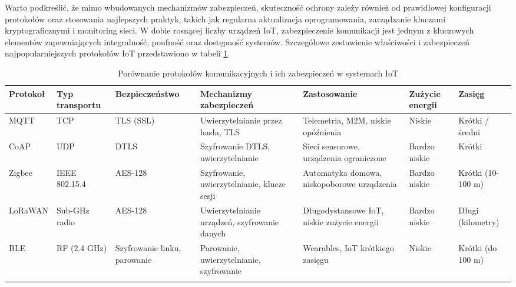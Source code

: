 Warto podkreślić, że mimo wbudowanych mechanizmów zabezpieczeń, skuteczność ochrony zależy również od prawidłowej konfiguracji protokołów oraz stosowania najlepszych praktyk, takich jak regularna aktualizacja oprogramowania, zarządzanie kluczami kryptograficznymi i monitoring sieci. W dobie rosnącej liczby urządzeń IoT, zabezpieczenie komunikacji jest jednym z kluczowych elementów zapewniających integralność, poufność oraz dostępność systemów.
Szczegółowe zestawienie właściwości i zabezpieczeń najpopularniejszych protokołów IoT przedstawiono w tabeli \ref{tab:iot_protocols_security}.
\begin{landscape}
\vspace*{2cm}
\renewcommand{\arraystretch}{1.3} 
\setlength{\tabcolsep}{4pt} 
\begin{table}[htbp]
\centering
\small 
\caption{Porównanie protokołów komunikacyjnych i ich zabezpieczeń w systemach IoT}
\label{tab:iot_protocols_security}
\begin{tabular}{|l|l|l|p{4cm}|p{3.5cm}|l|l|}
\hline
\textbf{Protokoł} & \textbf{Typ transportu} & \textbf{Bezpieczeństwo} & \textbf{Mechanizmy zabezpieczeń} & \textbf{Zastosowanie} & \textbf{Zużycie energii} & \textbf{Zasięg}\cite{sicari2015security} \\ \hline
MQTT & TCP & TLS (SSL) & Uwierzytelnianie przez hasła, TLS & Telemetria, M2M, niskie opóźnienia & Niskie & Krótki / średni \\ \hline
CoAP & UDP & DTLS & Szyfrowanie DTLS, uwierzytelnianie & Sieci sensorowe, urządzenia ograniczone & Bardzo niskie & Krótki \\ \hline
Zigbee & IEEE 802.15.4 & AES-128 & Szyfrowanie, uwierzytelnianie, klucze sesji & Automatyka domowa, niskopoborowe urządzenia & Bardzo niskie & Krótki (10-100 m) \\ \hline
LoRaWAN & Sub-GHz radio & AES-128 & Uwierzytelnianie urządzeń, szyfrowanie danych & Długodystansowe IoT, niskie zużycie energii & Bardzo niskie & Długi (kilometry) \\ \hline
BLE & RF (2.4 GHz) & Szyfrowanie linku, parowanie & Parowanie, uwierzytelnianie, szyfrowanie & Wearables, IoT krótkiego zasięgu & Niskie & Krótki (do 100 m) \\ \hline
\label{tab:iot_protocols_security}
\end{tabular}
\end{table}
\end{landscape}



